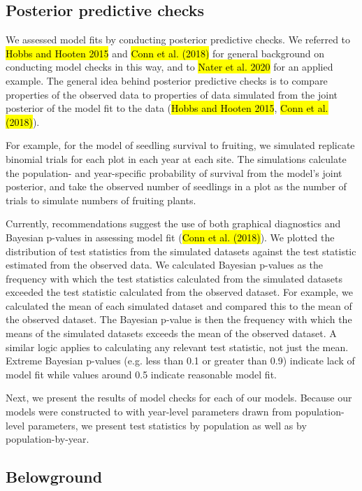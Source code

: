 \documentclass[12pt, oneside, titlepage]{article}   	%
\begin{document}
\subsection{Posterior predictive checks}

We assessed model fits by conducting posterior predictive checks. We referred to \hl{Hobbs and Hooten 2015}  and \hl{Conn et al. (2018)} for general background on conducting model checks in this way, and to \hl{Nater et al. 2020} for an applied example. The general idea behind posterior predictive checks is to compare properties of the observed data to properties of data simulated from the joint posterior of the model fit to the data (\hl{Hobbs and Hooten 2015}, \hl{Conn et al. (2018)}). 

For example, for the model of seedling survival to fruiting, we simulated replicate binomial trials for each plot in each year at each site. The simulations calculate the population- and year-specific probability of survival from the model's joint posterior, and take the observed number of seedlings in a plot as the number of trials to simulate numbers of fruiting plants. 

Currently, recommendations suggest the use of both graphical diagnostics and Bayesian p-values in assessing model fit (\hl{Conn et al. (2018)}). We plotted the distribution of test statistics from the simulated datasets against the test statistic estimated from the observed data. We calculated Bayesian p-values as the  frequency with which the test statistics calculated from the simulated datasets exceeded the test statistic calculated from the observed dataset. For example, we calculated the mean of each simulated dataset and compared this to the mean of the observed dataset. The Bayesian p-value is then the frequency with which the means of the simulated datasets exceeds the mean of the observed dataset. A similar logic applies to calculating any relevant test statistic, not just the mean. Extreme Bayesian p-values (e.g. less than 0.1 or greater than 0.9) indicate lack of model fit while values around 0.5 indicate reasonable model fit. 

Next, we present the results of model checks for each of our models. Because our models were constructed to with year-level parameters drawn from population-level parameters, we present test statistics by population as well as by population-by-year. 

\subsection{Belowground}
\end{document}
